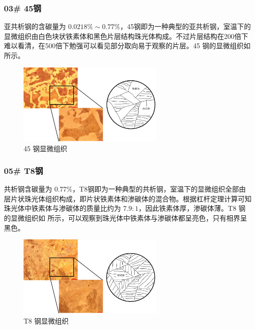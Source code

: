 \documentclass[a4paper,utf8]{article}
\begin{document}
        \subsubsection{03# 45钢}
            亚共析钢的含碳量为 $0.0218\%\sim 0.77\%$，45钢即为一种典型的亚共析钢，室温下的显微组织由白色块状铁素体和黑色片层结构珠光体构成。不过片层结构在200倍下难以看清，在500倍下勉强可以看见部分取向易于观察的片层。45 钢的显微组织如 所示。
            \begin{figure}[!ht]
                \includegraphics[height=40mm]{result/2.pdf}
                \caption{45 钢显微组织\label{fig:2}}
            \end{figure}

        \subsubsection{05# T8钢}
            共析钢含碳量为 0.77\%，T8钢即为一种典型的共析钢，室温下的显微组织全部由层片状珠光体组织构成，即片状铁素体和渗碳体的混合物。根据杠杆定理计算可知珠光体中铁素体与渗碳体的质量比约为 $7.9:1$，因此铁素体厚，渗碳体薄。T8 钢的显微组织如 所示，可以观察到珠光体中铁素体与渗碳体都呈亮色，只有相界呈黑色。
            \begin{figure}[!ht]
                \includegraphics[height=40mm]{result/3.pdf}
                \caption{T8 钢显微组织\label{fig:3}}
            \end{figure}
\end{document}
